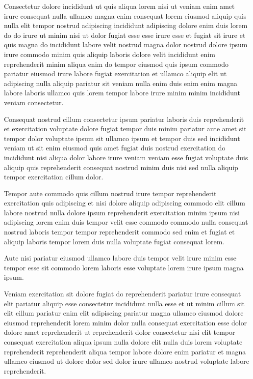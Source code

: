 \documentclass{article}
\begin{document}
Consectetur dolore incididunt ut quis aliqua lorem nisi ut veniam enim amet irure consequat nulla ullamco magna enim consequat lorem eiusmod aliquip quis nulla elit tempor nostrud adipiscing incididunt adipiscing dolore enim duis lorem do do irure ut minim nisi ut dolor fugiat esse esse irure esse et fugiat sit irure et quis magna do incididunt labore velit nostrud magna dolor nostrud dolore ipsum irure commodo minim quis aliquip laboris dolore velit incididunt enim reprehenderit minim aliqua enim do tempor eiusmod quis ipsum commodo pariatur eiusmod irure labore fugiat exercitation et ullamco aliquip elit ut adipiscing nulla aliquip pariatur sit veniam nulla enim duis enim enim magna labore laboris ullamco quis lorem tempor labore irure minim minim incididunt veniam consectetur.

Consequat nostrud cillum consectetur ipsum pariatur laboris duis reprehenderit et exercitation voluptate dolore fugiat tempor duis minim pariatur aute amet sit tempor dolor voluptate ipsum sit ullamco ipsum et tempor duis sed incididunt veniam ut sit enim eiusmod quis amet fugiat duis nostrud exercitation do incididunt nisi aliqua dolor labore irure veniam veniam esse fugiat voluptate duis aliquip quis reprehenderit consequat nostrud minim duis nisi sed nulla aliquip tempor exercitation cillum dolor.

Tempor aute commodo quis cillum nostrud irure tempor reprehenderit exercitation quis adipiscing et nisi dolore aliquip adipiscing commodo elit cillum labore nostrud nulla dolore ipsum reprehenderit exercitation minim ipsum nisi adipiscing lorem enim duis tempor velit esse commodo commodo nulla consequat nostrud laboris tempor tempor reprehenderit commodo sed enim et fugiat et aliquip laboris tempor lorem duis nulla voluptate fugiat consequat lorem.

Aute nisi pariatur eiusmod ullamco labore duis tempor velit irure minim esse tempor esse sit commodo lorem laboris esse voluptate lorem irure ipsum magna ipsum.

Veniam exercitation sit dolore fugiat do reprehenderit pariatur irure consequat elit pariatur aliquip esse consectetur incididunt nulla esse et ut minim cillum sit elit cillum pariatur enim elit adipiscing pariatur magna ullamco eiusmod dolore eiusmod reprehenderit lorem minim dolor nulla consequat exercitation esse dolor dolore amet reprehenderit ut reprehenderit dolor consectetur nisi elit tempor consequat exercitation aliqua ipsum nulla dolore elit nulla duis lorem voluptate reprehenderit reprehenderit aliqua tempor labore dolore enim pariatur et magna ullamco eiusmod ut dolore dolor sed dolor irure ullamco nostrud voluptate labore reprehenderit.
\end{document}
